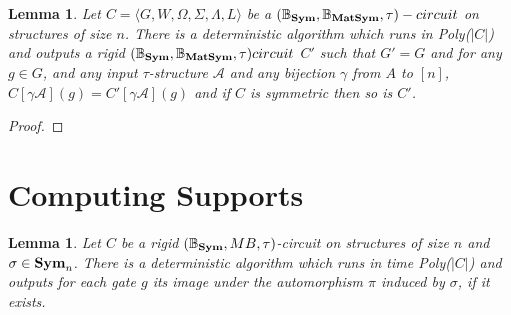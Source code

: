 \documentclass[12pt]{report}
\newtheorem{lem}[thm]{Lemma} \newtheorem{prop}[thm]{Proposition}
\newcommand{\MB}{\mathbb{B}_{\matsym}} %
\newcommand{\SB}{\mathbb{B}_{\sym}} %
\newcommand{\sym}{\text{\textbf{Sym}}}
\newcommand{\matsym}{\text{\textbf{MatSym}}}
\begin{document}
  \begin{lem}
    Let $C = \langle G, W, \Omega, \Sigma, \Lambda, L \rangle$ be a $(\SB, \MB,
    \tau)-circuit$ on structures of size $n$. There is a deterministic algorithm
    which runs in Poly($\vert C \vert$) and outputs a rigid $(\SB, \MB, \tau)
    circuit$ $C'$ such that $G' = G$ and for any $g \in G$, and any input
    $\tau$-structure $\mathcal{A}$ and any bijection $\gamma$ from $A$ to $[n]$,
    $C[\gamma \mathcal{A}](g) = C'[\gamma \mathcal{A}](g)$ and if $C$ is
    symmetric then so is $C'$.
  \end{lem}

  \begin{proof}
  
  \end{proof}

  \section{Computing Supports}
  \begin{lem}
    Let $C$ be a rigid $(\SB, MB, \tau)$-circuit on structures of size $n$ and
    $\sigma \in \sym_n$. There is a deterministic algorithm which runs in time
    Poly($\vert C \vert$) and outputs for each gate $g$ its image under the
    automorphism $\pi$ induced by $\sigma$, if it exists.
  \end{lem}
\end{document}

